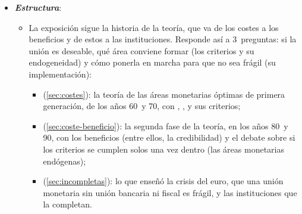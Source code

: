\documentclass[11pt]{article}
\begin{document}
\begin{itemize}
\item \textbf{\emph{Estructura}}:
  \begin{itemize}
  \item La exposición sigue la historia de la teoría, que va de los costes a los beneficios y de estos a las instituciones. Responde así a 3~preguntas: si la unión es deseable, qué área conviene formar (los criterios y su endogeneidad) y cómo ponerla en marcha para que no sea frágil (su implementación):
    \begin{itemize}
    \item {} (\ref{sec:costes}): la teoría de las áreas monetarias óptimas de primera generación, de los años 60~y 70, con , ,  y sus criterios;
    \item {} (\ref{sec:coste-beneficio}): la segunda fase de la teoría, en los años 80~y 90, con los beneficios (entre ellos, la credibilidad) y el debate sobre si los criterios se cumplen solos una vez dentro (las áreas monetarias endógenas);
    \item {} (\ref{sec:incompletas}): lo que enseñó la crisis del euro, que una unión monetaria sin unión bancaria ni fiscal es frágil, y las instituciones que la completan.
    \end{itemize}
  \end{itemize}
\end{itemize}
\end{document}
